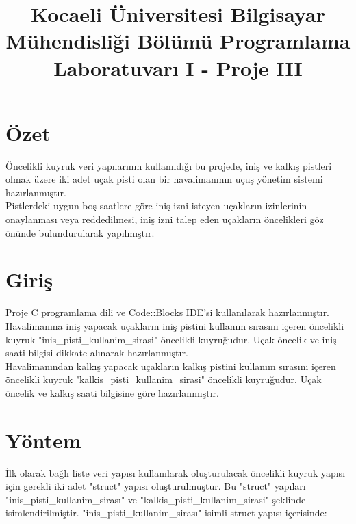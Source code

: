 \documentclass[conference]{IEEEtran}
\begin{document}
\title{Kocaeli Üniversitesi Bilgisayar Mühendisliği Bölümü Programlama Laboratuvarı I - Proje III\\}

\author{
}
\maketitle

\section{Özet}
Öncelikli kuyruk veri yapılarının kullanıldığı bu projede, iniş ve kalkış pistleri olmak üzere iki adet uçak pisti olan bir havalimanının uçuş yönetim sistemi hazırlanmıştır.\\

Pistlerdeki uygun boş saatlere göre iniş izni isteyen uçakların izinlerinin 
onaylanması veya reddedilmesi, iniş izni talep eden uçakların öncelikleri göz 
önünde bulundurularak yapılmıştır.

\section{Giriş}
Proje C programlama dili ve Code::Blocks IDE'si kullanılarak hazırlanmıştır. \\

Havalimanına iniş yapacak uçakların iniş pistini kullanım
sırasını içeren öncelikli kuyruk "inis\_pisti\_kullanim\_sirasi" öncelikli 
kuyruğudur. Uçak öncelik ve iniş saati bilgisi dikkate alınarak
hazırlanmıştır.\\

Havalimanından kalkış yapacak uçakların kalkış pistini
kullanım sırasını içeren öncelikli kuyruk "kalkis\_pisti\_kullanim\_sirasi" 
öncelikli kuyruğudur. Uçak öncelik ve kalkış saati bilgisine göre
hazırlanmıştır.\\

\section{Yöntem}
İlk olarak bağlı liste veri yapısı kullanılarak oluşturulacak öncelikli kuyruk 
yapısı için gerekli iki adet "struct" yapısı oluşturulmuştur. Bu "struct" 
yapıları "inis\_pisti\_kullanim\_sirası" ve "kalkis\_pisti\_kullanim\_sirasi" 
şeklinde isimlendirilmiştir. "inis\_pisti\_kullanim\_sirası" isimli struct 
yapısı içerisinde:\\
\end{document}

